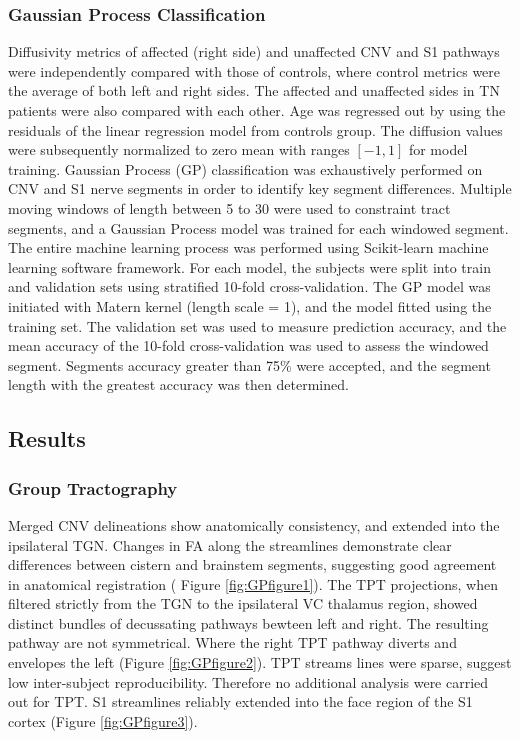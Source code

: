 \subsubsection{Gaussian Process Classification}

Diffusivity metrics of affected (right side) and unaffected CNV and S1 pathways were independently compared with those of controls, where control metrics were the average of both left and right sides. The affected and unaffected sides in TN patients were also compared with each other. 
Age was regressed out by using the residuals of the linear regression model from controls group. The diffusion values were subsequently normalized to zero mean with ranges $[-1, 1]$ for model training. 
Gaussian Process (GP) classification was exhaustively performed on CNV and S1 nerve segments in order to identify key segment differences. Multiple moving windows of length between 5 to 30 were used to constraint tract segments, and a Gaussian Process model was trained for each windowed segment. The entire machine learning process was performed using Scikit-learn machine learning software framework.
For each model, the subjects were split into train and validation sets using stratified 10-fold cross-validation. The GP model was initiated with Matern kernel (length scale = 1), and the model fitted using the training set. The validation set was used to measure prediction accuracy, and the mean accuracy of the 10-fold cross-validation was used to assess the windowed segment. Segments accuracy greater than 75\% were accepted, and the segment length with the greatest accuracy was then determined. 

\subsection{Results}
\subsubsection{Group Tractography}
Merged CNV delineations show anatomically consistency, and extended into the ipsilateral TGN. Changes in FA along the streamlines demonstrate clear differences between cistern and brainstem segments, suggesting good agreement in anatomical registration ( Figure \ref{fig:GPfigure1}). 
The TPT projections, when filtered strictly from the TGN to the ipsilateral VC thalamus region, showed distinct bundles of decussating pathways bewteen left and right. The resulting pathway are not symmetrical. Where the right TPT pathway diverts and envelopes the left (Figure \ref{fig:GPfigure2}). TPT streams lines were sparse, suggest low inter-subject reproducibility. Therefore no additional analysis were carried out for TPT.
S1 streamlines reliably extended into the face region of the S1 cortex (Figure \ref{fig:GPfigure3}). 

